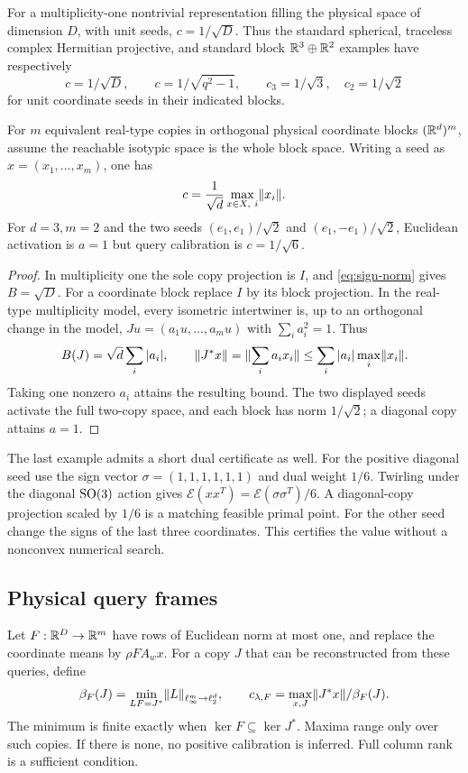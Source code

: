 \begin{proposition}\label{prop:calibration-examples}
For a multiplicity-one nontrivial representation filling the physical space of dimension $D$, with unit seeds, $c=1/\sqrt D$. Thus the standard spherical, traceless complex Hermitian projective, and standard block $\mathbb R^3\oplus\mathbb R^2$ examples have respectively
\[
 c=1/\sqrt D,\qquad c=1/\sqrt{q^2-1},\qquad
 c_3=1/\sqrt3,\quad c_2=1/\sqrt2
\]
for unit coordinate seeds in their indicated blocks.

For $m$ equivalent real-type copies in orthogonal physical coordinate blocks $(\mathbb R^d)^m$, assume the reachable isotypic space is the whole block space. Writing a seed as $x=(x_1,\ldots,x_m)$, one has
\begin{equation}\label{eq:real-multiplicity}
 c=\frac1{\sqrt d}\max_{x\in X,\ i}\lVert x_i\rVert.
\end{equation}
For $d=3,m=2$ and the two seeds $(e_1,e_1)/\sqrt2$ and $(e_1,-e_1)/\sqrt2$, Euclidean activation is $a=1$ but query calibration is $c=1/\sqrt6$.
\end{proposition}
\begin{proof}
In multiplicity one the sole copy projection is $I$, and \eqref{eq:sign-norm} gives $B=\sqrt D$. For a coordinate block replace $I$ by its block projection. In the real-type multiplicity model, every isometric intertwiner is, up to an orthogonal change in the model, $Ju=(a_1u,\ldots,a_mu)$ with $\sum_i a_i^2=1$. Thus
\[
 B(J)=\sqrt d\sum_i|a_i|,\qquad
 \lVert J^*x\rVert=\lVert\sum_i a_ix_i\rVert\le\sum_i|a_i|\max_i\lVert x_i\rVert.
\]
Taking one nonzero $a_i$ attains the resulting bound. The two displayed seeds activate the full two-copy space, and each block has norm $1/\sqrt2$; a diagonal copy attains $a=1$.
\end{proof}

The last example admits a short dual certificate as well. For the positive diagonal seed use the sign vector $\sigma=(1,1,1,1,1,1)$ and dual weight $1/6$. Twirling under the diagonal $\operatorname{SO}(3)$ action gives $\mathcal E(xx^T)=\mathcal E(\sigma\sigma^T)/6$. A diagonal-copy projection scaled by $1/6$ is a matching feasible primal point. For the other seed change the signs of the last three coordinates. This certifies the value without a nonconvex numerical search.

\subsection{Physical query frames}
Let $F:\mathbb R^D\to\mathbb R^m$ have rows of Euclidean norm at most one, and replace the coordinate means by $\rho F A_wx$. For a copy $J$ that can be reconstructed from these queries, define
\begin{equation}\label{eq:frame-beta}
 \beta_F(J)=\min_{LF=J^*}\lVert L\rVert_{\ell_\infty^m\to\ell_2^d},
 \qquad c_{\lambda,F}=\max_{x,J}\lVert J^*x\rVert/\beta_F(J).
\end{equation}
The minimum is finite exactly when $\ker F\subseteq\ker J^*$. Maxima range only over such copies. If there is none, no positive calibration is inferred. Full column rank is a sufficient condition.

